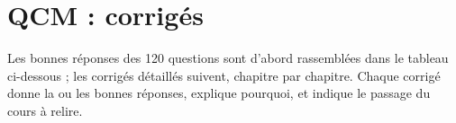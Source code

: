 \qcmbilan

\clearpage
{}
\section*{QCM : corrigés}\label{qcm:corr}

Les bonnes réponses des 120 questions sont d'abord rassemblées dans le tableau ci-dessous ; les corrigés détaillés suivent, chapitre
par chapitre. Chaque corrigé donne la ou les bonnes réponses, explique pourquoi, et indique le passage du cours à relire.

\qcmanswertable
\qcmprintallcorr
